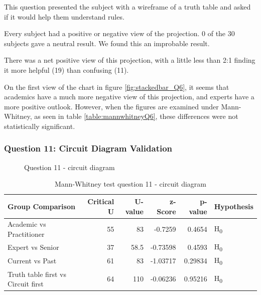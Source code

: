 This question presented the subject with a wireframe of a truth table and asked if it would help them understand rules.

Every subject had a positive or negative view of the projection.
0 of the 30 subjects gave a neutral result.
We found this an improbable result.

There was a net positive view of this projection, with a little less than 2:1 finding it more helpful (19) than confusing (11).

On the first view of the chart in figure \ref{fig:stackedbar_Q6}, it seems that academics have a much more negative view of this projection, and experts have a more positive outlook.
However, when the figures are examined under Mann-Whitney, as seen in table \ref{table:mannwhitneyQ6}, these differences were not statistically significant.

\subsubsection{Question 11: Circuit Diagram Validation}

\begin{figure}
    \centering
    \caption{Question 11 - circuit diagram}
    \label{fig:stackedbar_Q7}
\end{figure}

\begin{table}
    \begin{center}
        \begin{tabular}{ |l ||r |r |r | r|l | } 
            \hline
            Group Comparison                   & Critical U & U-value & z-Score  & p-value & Hypothesis         \\
            \hline
            \hline
            Academic vs Practitioner           & 55         & 83      & -0.7259  & 0.4654  & H\textsubscript{0} \\ 
            \hline
            Expert vs Senior                   & 37         & 58.5    & -0.73598 & 0.4593  & H\textsubscript{0} \\ 
            \hline
            Current vs Past                    & 61         & 83      & -1.03717 & 0.29834 & H\textsubscript{0} \\ 
            \hline
            Truth table first vs Circuit first & 64         & 110     & -0.06236 & 0.95216 & H\textsubscript{0} \\ 
            \hline
        \end{tabular}
    \end{center}
    \caption{Mann-Whitney test question 11 - circuit diagram}
    \label{table:mannwhitneyQ7}
\end{table}

